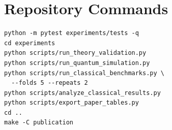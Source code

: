 \documentclass[10pt,twocolumn]{article}
\theoremstyle{definition}
\theoremstyle{remark}
\begin{document}
\begin{table}[t]
\centering
\caption{Mean accuracy for all methods.  Spec-A and Spec-F denote spectral
DECA with amplitude and affine encodings.  HGB denotes histogram gradient
boosting.}
\label{tab:full_accuracy}
\scriptsize
\resizebox{\textwidth}{!}{}
\end{table}

\section{Repository Commands}

{\footnotesize
\begin{verbatim}
python -m pytest experiments/tests -q
cd experiments
python scripts/run_theory_validation.py
python scripts/run_quantum_simulation.py
python scripts/run_classical_benchmarks.py \
  --folds 5 --repeats 2
python scripts/analyze_classical_results.py
python scripts/export_paper_tables.py
cd ..
make -C publication
\end{verbatim}
}



\end{document}
